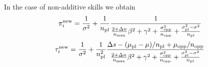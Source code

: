 \documentclass{article}
\begin{document}
In the case of non-additive skills we obtain
\begin{equation}
\pi_i^{\rm new} = \frac{1}{\sigma^2} + \frac{1}{n_{\rm pl}} \frac{1}{\frac{2 + \Delta n}{n_{\rm max}} \beta^2 + \gamma^2 + \frac{\sigma_{\rm opp}^2}{n_{\rm opp}} + \frac{\sigma_{\rm pl}^2 - \sigma^2}{n_{\rm pl}}}
\end{equation}
\begin{equation}
\tau_i^{\rm new} = \frac{1}{\sigma^2} + \frac{1}{n_{\rm pl}^2} \frac{\Delta s - (\mu_{\rm pl} - \mu)/n_{\rm pl} + \mu_{\rm opp}/ n_{\rm opp} }{\frac{2 + \Delta n}{n_{\rm max}} \beta^2 + \gamma^2 + \frac{\sigma_{\rm opp}^2}{n_{\rm opp}} + \frac{\sigma_{\rm pl}^2 - \sigma^2}{n_{\rm pl}}}
\end{equation}
\end{document}
